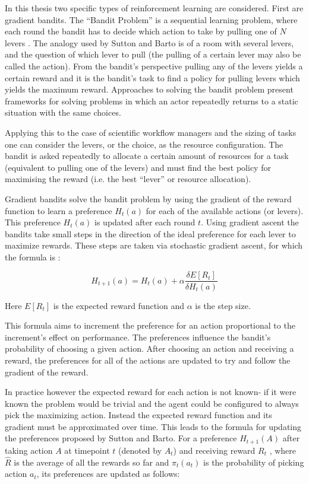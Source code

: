 In this thesis two specific types of reinforcement learning are considered. First are gradient bandits. The ``Bandit Problem'' is a sequential learning problem, where each round the bandit has to decide which action to take by pulling one of $N$ levers \cite{ding_efficient}. The analogy used by Sutton and Barto is of a room with several levers, and the question of which lever to pull (the pulling of a certain lever may also be called the action). From the bandit's perspective pulling any of the levers yields a certain reward and it is the bandit's task to find a policy for pulling levers which yields the maximum reward.  Approaches to solving the bandit problem present frameworks for solving problems in which an actor repeatedly returns to a static situation with the same choices. 

Applying this to the case of scientific workflow managers and the sizing of tasks one can consider the levers, or the choice, as the resource configuration. The bandit is asked repeatedly to allocate a certain amount of resources for a task (equivalent to pulling one of the levers) and must find the best policy for maximising the reward (i.e. the best “lever” or resource allocation). 

Gradient bandits solve the bandit problem by using the gradient of the reward function to learn a preference $H_t(a)$ for each of the available actions (or levers). This preference $H_t(a)$ is updated after each round $t$. Using gradient ascent the bandits take small steps in the direction of the ideal preference for each lever to maximize rewards. These steps are taken via stochastic gradient ascent, for which the formula is : 

\begin{equation}\label{gradient_ascent}
H_{t+1}(a) = H_t(a) + \alpha \frac{ \delta E[R_t] }  {\delta H_t(a)}
\end{equation}

Here $E[R_t]$ is the expected reward function and $\alpha$ is the step size.

This formula aims to increment the preference for an action proportional to the increment's effect on performance. The preferences influence the bandit’s probability of choosing a given action. After choosing an action and receiving a reward, the preferences for all of the actions are updated to try and follow the gradient of the reward. 

In practice however the expected reward for each action is not known- if it were known the problem would be trivial and the agent could be configured to always pick the maximizing action. Instead the expected reward function and its gradient must be approximated over time. This leads to the formula for updating the preferences proposed by Sutton and Barto. For a preference $H_{t+1}(A)$ after taking action $A$ at timepoint $t$ (denoted by $A_t$) and receiving reward $R_t$ , where $\hat{R}$ is the average of all the rewards so far and $\pi_t(a_t)$ is the probability of picking action $a_t$, its preferences are updated as follows: 

